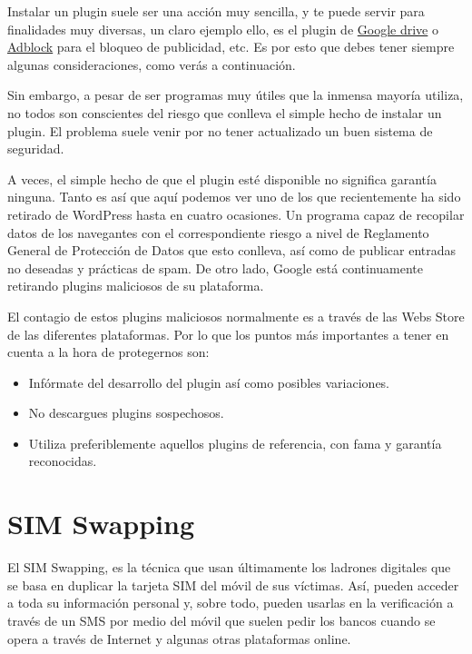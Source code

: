 \documentclass[
  a4paper,
  openany]{book}
\begin{document}
Instalar un plugin suele ser una acción muy sencilla, y te puede servir para finalidades muy diversas, un claro ejemplo ello, es el plugin de \href{https://drive.googleblog.com/2012/12/introducing-save-to-drive-extension.html}{Google drive} o \href{https://getadblock.com/}{Adblock} para el bloqueo de publicidad, etc. Es por esto que debes tener siempre algunas consideraciones, como verás a continuación.

Sin embargo, a pesar de ser programas muy útiles que la inmensa mayoría utiliza, no todos son conscientes del riesgo que conlleva el simple hecho de instalar un plugin. El problema suele venir por no tener actualizado un buen sistema de seguridad.

A veces, el simple hecho de que el plugin esté disponible no significa garantía ninguna. Tanto es así que aquí podemos ver uno de los que recientemente ha sido retirado de WordPress hasta en cuatro ocasiones. Un programa capaz de recopilar datos de los navegantes con el correspondiente riesgo a nivel de Reglamento General de Protección de Datos que esto conlleva, así como de publicar entradas no deseadas y prácticas de spam. De otro lado, Google está continuamente retirando plugins maliciosos de su plataforma.

El contagio de estos plugins maliciosos normalmente es a través de las Webs Store de las diferentes plataformas. Por lo que los puntos más importantes a tener en cuenta a la hora de protegernos son:

\begin{itemize}
\item
  Infórmate del desarrollo del plugin así como posibles variaciones.
\item
  No descargues plugins sospechosos.
\item
  Utiliza preferiblemente aquellos plugins de referencia, con fama y garantía reconocidas.
\end{itemize}

\hypertarget{sim-swapping}{%
\section{SIM Swapping}\label{sim-swapping}}

El SIM Swapping, es la técnica que usan últimamente los ladrones digitales que se basa en duplicar la tarjeta SIM del móvil de sus víctimas. Así, pueden acceder a toda su información personal y, sobre todo, pueden usarlas en la verificación a través de un SMS por medio del móvil que suelen pedir los bancos cuando se opera a través de Internet y algunas otras plataformas online.
\end{document}
